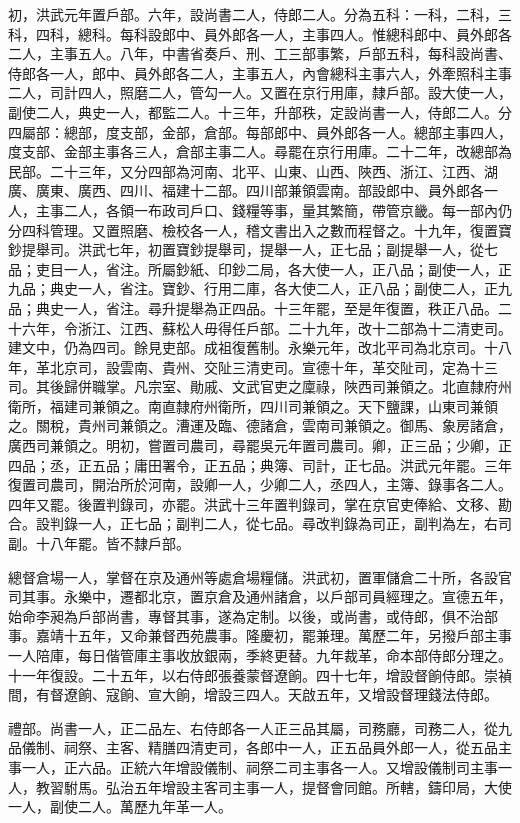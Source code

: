 初，洪武元年置戶部。六年，設尚書二人，侍郎二人。分為五科：一科，二科，三科，四科，總科。每科設郎中、員外郎各一人，主事四人。惟總科郎中、員外郎各二人，主事五人。八年，中書省奏戶、刑、工三部事繁，戶部五科，每科設尚書、侍郎各一人，郎中、員外郎各二人，主事五人，內會總科主事六人，外牽照科主事二人，司計四人，照磨二人，管勾一人。又置在京行用庫，隸戶部。設大使一人，副使二人，典史一人，都監二人。十三年，升部秩，定設尚書一人，侍郎二人。分四屬部：總部，度支部，金部，倉部。每部郎中、員外郎各一人。總部主事四人，度支部、金部主事各三人，倉部主事二人。尋罷在京行用庫。二十二年，改總部為民部。二十三年，又分四部為河南、北平、山東、山西、陜西、浙江、江西、湖廣、廣東、廣西、四川、福建十二部。四川部兼領雲南。部設郎中、員外郎各一人，主事二人，各領一布政司戶口、錢糧等事，量其繁簡，帶管京畿。每一部內仍分四科管理。又置照磨、檢校各一人，稽文書出入之數而程督之。十九年，復置寶鈔提舉司。洪武七年，初置寶鈔提舉司，提舉一人，正七品；副提舉一人，從七品；吏目一人，省注。所屬鈔紙、印鈔二局，各大使一人，正八品；副使一人，正九品；典史一人，省注。寶鈔、行用二庫，各大使二人，正八品；副使二人，正九品；典史一人，省注。尋升提舉為正四品。十三年罷，至是年復置，秩正八品。二十六年，令浙江、江西、蘇松人毋得任戶部。二十九年，改十二部為十二清吏司。建文中，仍為四司。餘見吏部。成祖復舊制。永樂元年，改北平司為北京司。十八年，革北京司，設雲南、貴州、交阯三清吏司。宣德十年，革交阯司，定為十三司。其後歸併職掌。凡宗室、勛戚、文武官吏之廩祿，陜西司兼領之。北直隸府州衛所，福建司兼領之。南直隸府州衛所，四川司兼領之。天下鹽課，山東司兼領之。關稅，貴州司兼領之。漕運及臨、德諸倉，雲南司兼領之。御馬、象房諸倉，廣西司兼領之。明初，嘗置司農司，尋罷吳元年置司農司。卿，正三品；少卿，正四品；丞，正五品；庸田署令，正五品；典簿、司計，正七品。洪武元年罷。三年復置司農司，開治所於河南，設卿一人，少卿二人，丞四人，主簿、錄事各二人。四年又罷。後置判錄司，亦罷。洪武十三年置判錄司，掌在京官吏俸給、文移、勘合。設判錄一人，正七品；副判二人，從七品。尋改判錄為司正，副判為左，右司副。十八年罷。皆不隸戶部。

總督倉場一人，掌督在京及通州等處倉場糧儲。洪武初，置軍儲倉二十所，各設官司其事。永樂中，遷都北京，置京倉及通州諸倉，以戶部司員經理之。宣德五年，始命李昶為戶部尚書，專督其事，遂為定制。以後，或尚書，或侍郎，俱不治部事。嘉靖十五年，又命兼督西苑農事。隆慶初，罷兼理。萬歷二年，另撥戶部主事一人陪庫，每日偕管庫主事收放銀兩，季終更替。九年裁革，命本部侍郎分理之。十一年復設。二十五年，以右侍郎張養蒙督遼餉。四十七年，增設督餉侍郎。崇禎間，有督遼餉、寇餉、宣大餉，增設三四人。天啟五年，又增設督理錢法侍郎。

禮部。尚書一人，正二品左、右侍郎各一人正三品其屬，司務廳，司務二人，從九品儀制、祠祭、主客、精膳四清吏司，各郎中一人，正五品員外郎一人，從五品主事一人，正六品。正統六年增設儀制、祠祭二司主事各一人。又增設儀制司主事一人，教習駙馬。弘治五年增設主客司主事一人，提督會同館。所轄，鑄印局，大使一人，副使二人。萬歷九年革一人。

